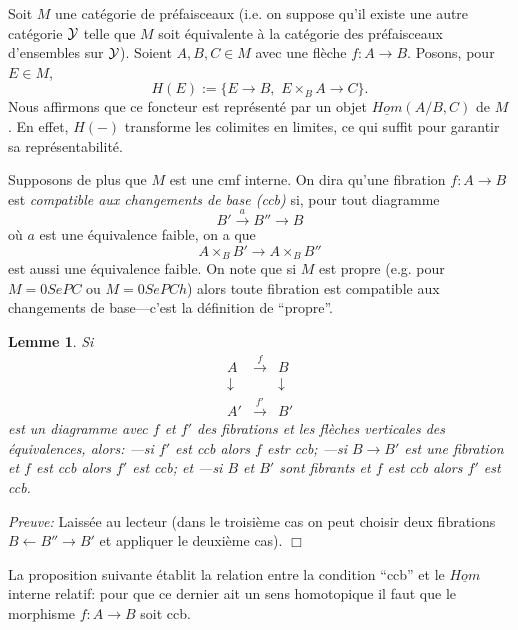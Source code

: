 \documentclass[12pt]{article}
\newcommand{\eop}{\hfill $\Box$\vspace{.1in}}
\newtheorem{lemme}[lemma]{Lemme}
\newcommand{\Yy}{{\cal Y}}
\begin{document}
Soit $M$ une cat\'egorie de pr\'efaisceaux (i.e. on suppose qu'il
existe une autre cat\'egorie $\Yy$ telle que $M$ soit \'equivalente \`a la
cat\'egorie des pr\'efaisceaux d'ensembles sur $\Yy$). Soient
$A,B,C\in M$ avec
une fl\`eche $f:A\rightarrow B$. Posons, pour $E\in M$,
$$
H(E):= \{ E\rightarrow B, \, \, E\times _BA\rightarrow C\} .
$$
Nous affirmons que ce foncteur est repr\'esent\'e par un objet
$\underline{Hom}(A/B,
C)$ de $M$. En effet, $H(-)$ transforme les colimites en limites,
ce qui suffit
pour garantir sa repr\'esentabilit\'e.

Supposons de plus que $M$ est une cmf interne. On dira qu'une fibration
$f:A\rightarrow B$ est {\em compatible aux changements de base (ccb)}
si, pour
tout diagramme
$$
B'\stackrel{a}{\rightarrow} B'' \rightarrow B
$$
o\`u $a$ est une \'equivalence faible, on a que
$$
A\times _BB'\rightarrow A\times _BB''
$$
est aussi une \'equivalence faible. On note que si $M$ est propre
(e.g. pour $M=0SePC$
ou $M=0SePCh$) alors toute fibration est compatible aux changements de
base---c'est la d\'efinition de ``propre''.

\begin{lemme}
\label{ccb1}
Si
$$
\begin{array}{ccc}
A&\stackrel{f}{\rightarrow}& B\\
\downarrow && \downarrow \\
A'&\stackrel{f'}{\rightarrow}& B'
\end{array}
$$
est un diagramme avec $f$ et $f'$ des fibrations et les fl\`eches
verticales des
\'equivalences, alors:
\newline
---si $f'$ est ccb alors $f$ estr ccb;
\newline
---si $B\rightarrow B'$ est une fibration et $f$ est ccb alors $f'$
est ccb; et
\newline
---si $B$ et $B'$ sont fibrants et $f$ est ccb alors $f'$ est ccb.
\end{lemme}
{\em Preuve:}
Laiss\'ee au lecteur (dans le troisi\`eme cas on peut choisir
deux fibrations $B\leftarrow B'' \rightarrow B'$ et
appliquer le deuxi\`eme cas).
\eop

La proposition suivante \'etablit la relation entre la condition ``ccb''
et le $\underline{Hom}$ interne relatif: pour que ce dernier ait un sens
homotopique il faut que le morphisme $f:A\rightarrow B$ soit ccb.
\end{document}
